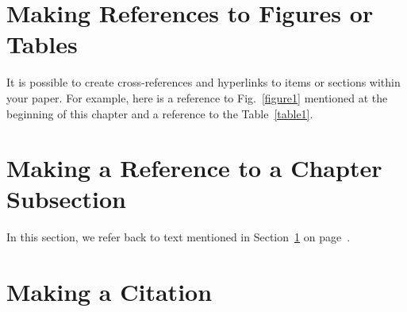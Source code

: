 
\section{Making References to Figures or Tables}
\label{makereference1.1}

It is possible to create cross-references and hyperlinks to items or
sections within your paper.  For example, here is a reference to
Fig.~\ref{figure1} mentioned at the beginning of this chapter and a
reference to the Table~\ref{table1}.

\section{Making a Reference to a Chapter Subsection}
\label{makereference1.2}

In this section, we refer back to text mentioned in
Section~\ref{makereference1.1} on page~\pageref{makereference1.1}.

\section{Making a Citation}
\label{makereference1.3}

%
